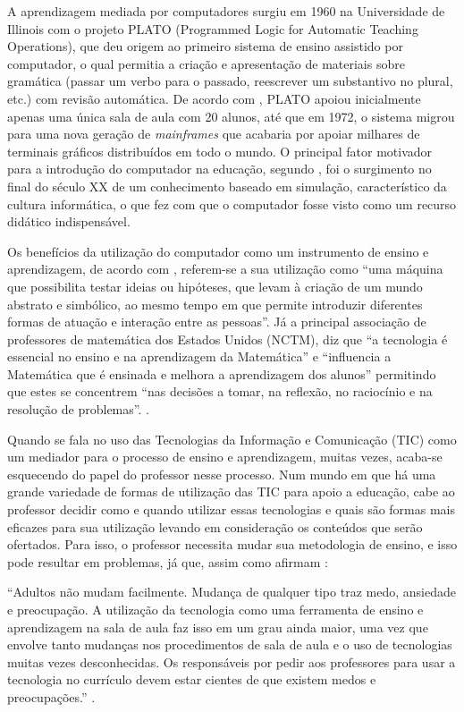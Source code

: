A aprendizagem mediada por computadores surgiu em 1960 na Universidade de Illinois com o projeto PLATO (Programmed Logic for Automatic Teaching Operations)\cite{bitzer1961plato}, que deu origem ao primeiro sistema de ensino assistido por computador, o qual permitia a criação e apresentação de materiais sobre gram\'atica (passar um verbo para o passado, reescrever um substantivo no plural, etc.) com revisão automática. De acordo com , PLATO apoiou inicialmente apenas uma única sala de aula com 20 alunos, até que em 1972, o sistema migrou para uma nova geração de \textit{mainframes} que acabaria por apoiar milhares de terminais gráficos distribuídos em todo o mundo. O principal fator motivador para a introdução do computador na educação, segundo , foi o surgimento no final do século XX de um conhecimento baseado em simulação, característico da cultura informática, o que fez com que o computador fosse visto como  um recurso didático  indispensável.

Os benefícios da utilização do computador como um instrumento de ensino e aprendizagem, de acordo com , referem-se a sua utilização como ``uma máquina que 
possibilita testar ideias ou hipóteses, que levam à criação de um mundo abstrato e simbólico, ao mesmo tempo em que permite introduzir diferentes formas de atuação e interação entre as pessoas''. Já a 
principal associação de professores de matemática dos Estados Unidos (NCTM), diz que ``a tecnologia é essencial no ensino e 
na aprendizagem da Matemática'' e ``influencia a Matemática que é ensinada e melhora a aprendizagem dos alunos'' permitindo que estes se concentrem ``nas decisões a tomar, na reflexão, no raciocínio e 
na resolução de problemas''. \cite[p.26]{melo2007principios}.

Quando se fala no uso das Tecnologias da Informação e Comunicação (TIC) como um mediador para o processo de ensino e aprendizagem, muitas vezes, acaba-se esquecendo do papel do professor nesse 
processo. Num mundo em que há uma grande variedade de formas de utilização das TIC para apoio a educação, cabe ao professor decidir como e quando utilizar essas tecnologias e quais s\~ao formas 
mais eficazes para sua utilização levando em consideração os conteúdos que serão ofertados. Para isso, o professor necessita mudar sua metodologia de ensino, e isso pode resultar em problemas, já 
que, assim como afirmam :

\begin{citacao}
``Adultos não mudam facilmente. Mudança de qualquer tipo traz medo, ansiedade e preocupação. A utilização da tecnologia como uma ferramenta de ensino e aprendizagem na sala de aula faz isso em um grau ainda maior, uma vez que envolve tanto mudanças nos procedimentos de sala de aula e o uso de tecnologias muitas vezes desconhecidas. Os responsáveis por pedir aos professores para usar a tecnologia no currículo devem estar cientes de que existem medos e preocupações.'' \cite[p.~96, Tradução Livre]{bitner2002integrating}.
\end{citacao}

